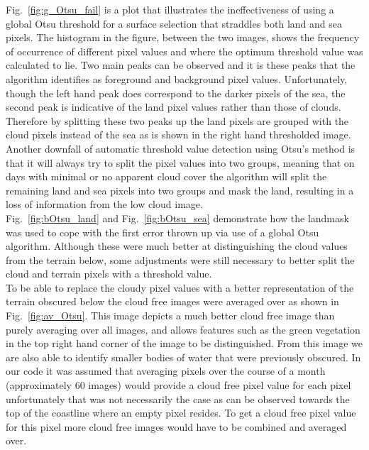 Fig.~\ref{fig:g_Otsu_fail} is a plot that illustrates the ineffectiveness of using a global Otsu threshold for a surface selection that straddles both land and sea pixels. The histogram in the figure, between the two images, shows the frequency of occurrence of different pixel values and where the optimum threshold value was calculated to lie. Two main peaks can be observed and it is these peaks that the algorithm identifies as foreground and background pixel values. Unfortunately, though the left hand peak does correspond to the darker pixels of the sea, the second peak is indicative of the land pixel values rather than those of clouds. Therefore by splitting these two peaks up the land pixels are grouped with the cloud pixels instead of the sea as is shown in the right hand thresholded image. Another downfall of automatic threshold value detection using Otsu's method is that it will always try to split the pixel values into two groups, meaning that on days with minimal or no apparent cloud cover the algorithm will split the remaining land and sea pixels into two groups and mask the land, resulting in a loss of information from the low cloud image.\\

Fig.~\ref{fig:bOtsu_land} and Fig.~\ref{fig:bOtsu_sea} demonstrate how the landmask was used to cope with the first error thrown up via use of a global Otsu algorithm. Although these were much better at distinguishing the cloud values from the terrain below, some adjustments were still necessary to better split the cloud and terrain pixels with a threshold value.\\

To be able to replace the cloudy pixel values with a better representation of the terrain obscured below the cloud free images were averaged over as shown in Fig.~\ref{fig:av_Otsu}. This image depicts a much better cloud free image than purely averaging over all images, and allows features such as the green vegetation in the top right hand corner of the image to be distinguished. From this image we are also able to identify smaller bodies of water that were previously obscured. In our code it was assumed that averaging pixels over the course of a month (approximately 60 images) would provide a cloud free pixel value for each pixel unfortunately that was not necessarily the case as can be observed towards the top of the coastline where an empty pixel resides. To get a cloud free pixel value for this pixel more cloud free images would have to be combined and averaged over.\\


